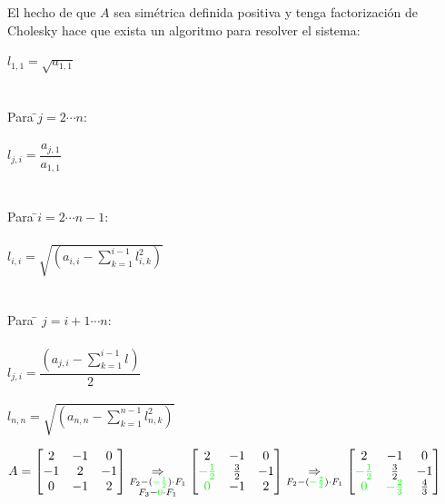 \documentclass[]{article}
\begin{document}
El hecho de que $A$ sea simétrica definida positiva y tenga factorización de Cholesky hace que exista un algoritmo para resolver el sistema:
\begin{tabbing}
$l_{1,1} = \sqrt{a_{1,1}}$\\\\\\
Para \=$j = 2 \cdots n$:\\\\
\> $l_{j,i} = \dfrac{a_{j,1}}{a_{1,1}}$\\\\\\
Para \=$i = 2\cdots n-1$:\\\\
\> $l_{i,i} = \displaystyle \sqrt{\left(a_{i,i}-\sum_{k=1}^{i-1}{l_{i,k}^2}\right)}$\\\\\\
\> Para \= $j=i+1\cdots n$:\\\\
\> \> $l_{j,i} = \dfrac{\left(a_{j,i}-\sum_{k=1}^{i-1}{l_{}}\right)}{2}$\\\\
$l_{n,n} = \sqrt{\left(a_{n,n} - \sum_{k=1}^{n-1}{l_{n,k}^2}\right)}$\\
\end{tabbing}

\begin{center}
	$A=\begin{bmatrix}
		2&-1&0\\
		-1&2&-1\\
		0&-1&2
	\end{bmatrix}\underset{\substack{F_2 - (\mathbin{\color{green}{-\frac{1}{2}}})\cdot F_1 \\ F_3 - \mathbin{\color{green}{0}}\cdot F_1}}{\Rightarrow} \begin{bmatrix}
		2&-1&0\\
		\mathbin{\color{green}{-\frac{1}{2}}}&\frac{3}{2}&-1\\
		\mathbin{\color{green}{0}}&-1&2
	\end{bmatrix}\underset{\substack{F_2 - (\mathbin{\color{green}{-\frac{2}{3}}})\cdot F_1}}{\Rightarrow} \begin{bmatrix}
		2&-1&0\\
		\mathbin{\color{green}{-\frac{1}{2}}}&\frac{3}{2}&-1\\
		\mathbin{\color{green}{0}}&\mathbin{\color{green}{-\frac{2}{3}}}&\frac{4}{3}\\
	\end{bmatrix}$
\end{center}
\end{document}
